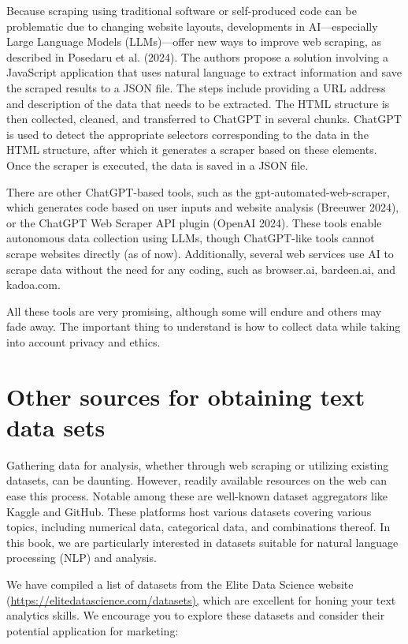 Because scraping using traditional software or self-produced code can be
problematic due to changing website layouts, developments in
AI---especially Large Language Models (LLMs)---offer new ways to improve
web scraping, as described in Posedaru et al. (2024). The authors propose a
solution involving a JavaScript application that uses natural language
to extract information and save the scraped results to a JSON file. The
steps include providing a URL address and description of the data that
needs to be extracted. The HTML structure is then collected, cleaned, and
transferred to ChatGPT in several chunks. ChatGPT is used to detect the
appropriate selectors corresponding to the data in the HTML structure,
after which it generates a scraper based on these elements.
Once the scraper is executed, the data is saved in a JSON file.

There are other ChatGPT-based tools, such as the gpt-automated-web-scraper,
which generates code based on user inputs and website analysis (Breeuwer
2024), or the ChatGPT Web Scraper API plugin (OpenAI 2024). These
tools enable autonomous data collection using LLMs, though ChatGPT-like
tools cannot scrape websites directly (as of now). Additionally, several
web services use AI to scrape data without the need for any coding,
such as browser.ai, bardeen.ai, and kadoa.com.

All these tools are very promising, although some will endure and others may
fade away. The important thing to understand is how to collect
data while taking into account privacy and ethics.

\section{Other sources for obtaining text data
sets}\label{other-sources-to-obtain-text-data-sets}

Gathering data for analysis, whether through web scraping or utilizing
existing datasets, can be daunting. However, readily available resources
on the web can ease this process. Notable among these are well-known
dataset aggregators like Kaggle and GitHub. These platforms host various
datasets covering various topics, including numerical data, categorical
data, and combinations thereof. In this book, we are particularly
interested in datasets suitable for natural language processing (NLP)
and analysis.

We have compiled a list of datasets from the Elite Data Science website
(\url{https://elitedatascience.com/datasets),} which are excellent for
honing your text analytics skills. We encourage you to explore these
datasets and consider their potential application for marketing:

